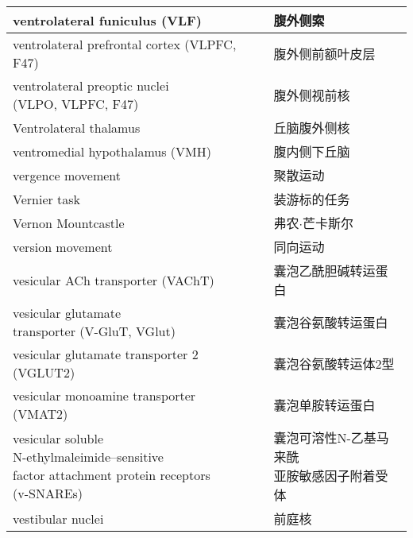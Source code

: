 \begin{longtable}{lll}
	\midrule
	ventrolateral funiculus (VLF)   && 腹外侧索  \\
	
	\midrule
	ventrolateral prefrontal cortex (VLPFC, F47)   && 腹外侧前额叶皮层  \\
	
	\midrule
	\makecell[l]{ventrolateral preoptic nuclei\\ (VLPO, VLPFC, F47)}  && 腹外侧视前核  \\
	
	\midrule
	Ventrolateral thalamus   && 丘脑腹外侧核  \\
	
	\midrule
	ventromedial hypothalamus (VMH)  && 腹内侧下丘脑  \\
	
	\midrule
	vergence movement   && 聚散运动  \\
	
	\midrule
	Vernier task   && 装游标的任务  \\
	
	\midrule
	Vernon Mountcastle   && 弗农$\cdot$芒卡斯尔  \\
	
	\midrule
	version movement   && 同向运动  \\
	
	\midrule
	vesicular ACh transporter (VAChT)   && 囊泡乙酰胆碱转运蛋白  \\
	
	\midrule
	\makecell[l]{vesicular glutamate \\transporter (V-GluT, VGlut)}   && 囊泡谷氨酸转运蛋白  \\
	
	\midrule
	vesicular glutamate transporter 2 (VGLUT2)   && 囊泡谷氨酸转运体2型  \\
	
	\midrule
	vesicular monoamine transporter (VMAT2)   && 囊泡单胺转运蛋白  \\
	
	\midrule
	\makecell[l]{vesicular soluble \\N-ethylmaleimide–sensitive \\factor attachment protein receptors\\ (v-SNAREs)}  && \makecell[l]{囊泡可溶性N-乙基马来酰\\亚胺敏感因子附着受体}  \\
	
	\midrule
	vestibular nuclei   && 前庭核  \\
	

\end{longtable}
